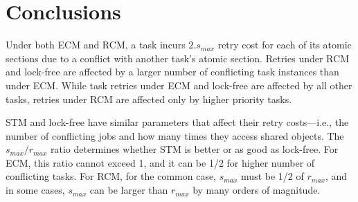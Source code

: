 \documentclass[letter]{sig-alternate}
\begin{document}

\section{Conclusions}
\label{sec:conclusions}

Under both ECM and RCM,  
a task incurs $2.s_{max}$ retry cost for each of its atomic sections due to a conflict with another task's atomic section. Retries under RCM and lock-free are affected by a larger number of conflicting task instances than under ECM. While task retries under ECM and lock-free are affected by all other tasks, retries under RCM are affected only by higher priority tasks. 


STM and lock-free have similar parameters that affect their retry costs---i.e., the number of conflicting jobs and how many times they access shared objects. The $s_{max}/r_{max}$ ratio determines whether STM is better or as good as lock-free. For ECM, this ratio cannot exceed 1, and it can be 1/2 for higher number of conflicting tasks. For RCM, for the common case, $s_{max}$ must be 1/2 of $r_{max}$, and in some cases, $s_{max}$ can be larger than $r_{max}$ by many orders of magnitude.
\end{document}
